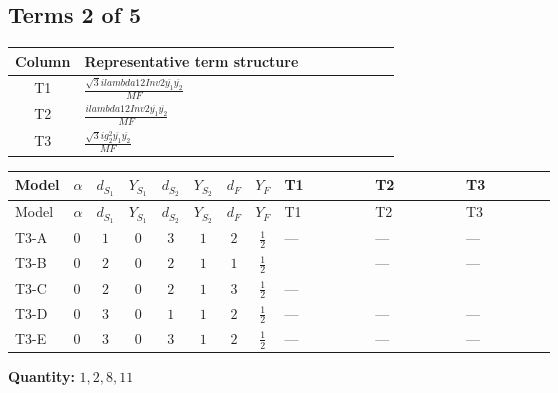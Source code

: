 \documentclass[8pt]{article}
\begin{document}
\begin{landscape}
\subsection*{Terms 2 of 5}
\begin{center}
\begin{tabular}{@{}c >{\raggedright\arraybackslash}p{0.82\linewidth}@{}}
\toprule
Column & Representative term structure \\
\midrule
T1 & \(\displaystyle \frac{\sqrt{3} i lambda12Inv2 \overline{y_{1}} \overline{y_{2}}}{MF}\) \\
\midrule
T2 & \(\displaystyle \frac{i lambda12Inv2 \overline{y_{1}} \overline{y_{2}}}{MF}\) \\
\midrule
T3 & \(\displaystyle \frac{\sqrt{3} i g_{2}^{2} \overline{y_{1}} \overline{y_{2}}}{MF}\) \\
\midrule
\bottomrule
\end{tabular}
\end{center}
\smallskip
\tiny
\begin{longtable}{@{}llcccccc >{\raggedright\arraybackslash}p{0.21\linewidth} >{\raggedright\arraybackslash}p{0.21\linewidth} >{\raggedright\arraybackslash}p{0.21\linewidth}@{}}
\toprule
Model & $\alpha$ & $d_{S_1}$ & $Y_{S_1}$ & $d_{S_2}$ & $Y_{S_2}$ & $d_F$ & $Y_F$ & T1 & T2 & T3 \\
\midrule
\endfirsthead
\toprule
Model & $\alpha$ & $d_{S_1}$ & $Y_{S_1}$ & $d_{S_2}$ & $Y_{S_2}$ & $d_F$ & $Y_F$ & T1 & T2 & T3 \\
\midrule
\endhead
T3-A & $0$ & $1$ & $0$ & $3$ & $1$ & $2$ & $\frac{1}{2}$ & --- & --- & --- \\
\midrule
T3-B & $0$ & $2$ & $0$ & $2$ & $1$ & $1$ & $\frac{1}{2}$ & \scriptsize\adjustbox{max width=\linewidth}{$\begin{gathered} \frac{\sqrt{3} i lambda12Inv2 \overline{y_{1}} \overline{y_{2}}}{6 MF}\end{gathered}$} & --- & --- \\
\midrule
T3-C & $0$ & $2$ & $0$ & $2$ & $1$ & $3$ & $\frac{1}{2}$ & --- & \scriptsize\adjustbox{max width=\linewidth}{$\begin{gathered} - \frac{i lambda12Inv2 \overline{y_{1}} \overline{y_{2}}}{6 MF}\end{gathered}$} & \scriptsize\adjustbox{max width=\linewidth}{$\begin{gathered} - \frac{\sqrt{3} i g_{2}^{2} \overline{y_{1}} \overline{y_{2}}}{8 MF}\end{gathered}$} \\
\midrule
T3-D & $0$ & $3$ & $0$ & $1$ & $1$ & $2$ & $\frac{1}{2}$ & --- & --- & --- \\
\midrule
T3-E & $0$ & $3$ & $0$ & $3$ & $1$ & $2$ & $\frac{1}{2}$ & --- & --- & --- \\
\midrule
\bottomrule
\end{longtable}
\clearpage
\noindent\textbf{Quantity: }$\mathrm{1,2,8,11}$\par\smallskip

\end{landscape}
\end{document}

